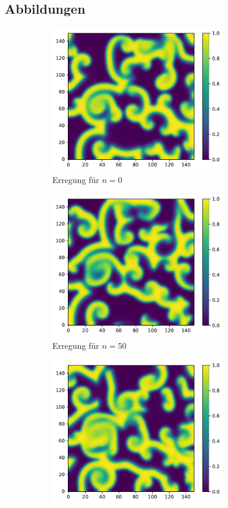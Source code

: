 \begin{appendices}
\chapter{Abbildungen}

\begin{figure}[h]
	\centering
	\begin{subfigure}{.5\textwidth}
		\centering
		\includegraphics[height=2.5in]{figures/results/dynamics/barkley_0.pdf}
		\setcapmargin[1cm]{0.5cm}
		\caption{Erregung für $n=0$}
	\end{subfigure}%
	\begin{subfigure}{.5\textwidth}
		\centering
		\includegraphics[height=2.5in]{figures/results/dynamics/barkley_50.pdf}
		\setcapmargin[1cm]{0.5cm}
		\caption{Erregung für $n=50$}
	\end{subfigure}
	\begin{subfigure}{.5\textwidth}
		\centering
		\includegraphics[height=2.5in]{figures/results/dynamics/barkley_100.pdf}

\end{subfigure}
\end{figure}
\end{appendices}
